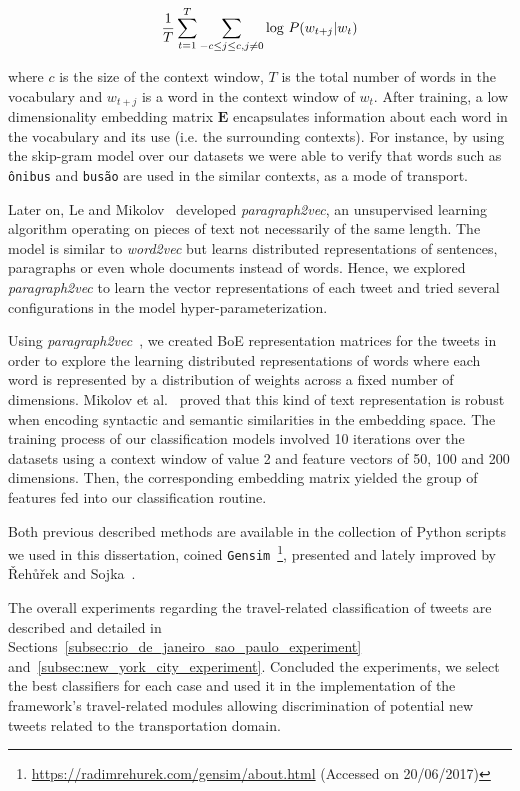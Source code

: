 \begin{equation}
\frac{1}{T}  \sum_{t=1}^{T}  \sum_{-c \leq j \leq  c, j \neq 0} \textnormal{log } P(w_{t+j} | w_t)
\end{equation}

where $c$ is the size of the context window, $T$ is the total number of words in the vocabulary and $w_{t+j}$ is a word in the context window of $w_t$. After training, a low dimensionality embedding matrix $\textbf{E}$ encapsulates information about each word in the vocabulary and its use (i.e. the surrounding contexts). For instance, by using the skip-gram model over our datasets we were able to verify that words such as \texttt{ônibus} and \texttt{busão} are used in the similar contexts, as a mode of transport.

Later on, Le and Mikolov~\cite{le2014distributed} developed \emph{paragraph2vec}, an unsupervised learning algorithm operating on pieces of text not necessarily of the same length. The model is similar to \emph{word2vec} but learns distributed representations of sentences, paragraphs or even whole documents instead of words. Hence, we explored \emph{paragraph2vec} to learn the vector representations of each tweet and tried several configurations in the model hyper-parameterization.

Using \textit{paragraph2vec}~\cite{le2014distributed}, we created \gls{BoE} representation matrices for the tweets in order to explore the learning distributed representations of words where each word is represented by a distribution of weights across a fixed number of dimensions. Mikolov et al.~\cite{mikolov2013linguistic} proved that this kind of text representation is robust when encoding syntactic and semantic similarities in the embedding space. The training process of our classification models involved 10 iterations over the datasets using a context window of value 2 and feature vectors of 50, 100 and 200 dimensions. Then, the corresponding embedding matrix yielded the group of features fed into our classification routine.

Both previous described methods are available in the collection of Python scripts we used in this dissertation, coined \texttt{Gensim}~\footnote{\url{https://radimrehurek.com/gensim/about.html} (Accessed on 20/06/2017)}, presented and lately improved by \v{R}eh\r{u}\v{r}ek and Sojka~\cite{rehurek2010software}.

The overall experiments regarding the travel-related classification of tweets are described and detailed in Sections~\ref{subsec:rio_de_janeiro_sao_paulo_experiment} and~\ref{subsec:new_york_city_experiment}. Concluded the experiments, we select the best classifiers for each case and used it in the implementation of the framework's travel-related modules allowing discrimination of potential new tweets related to the transportation domain.


